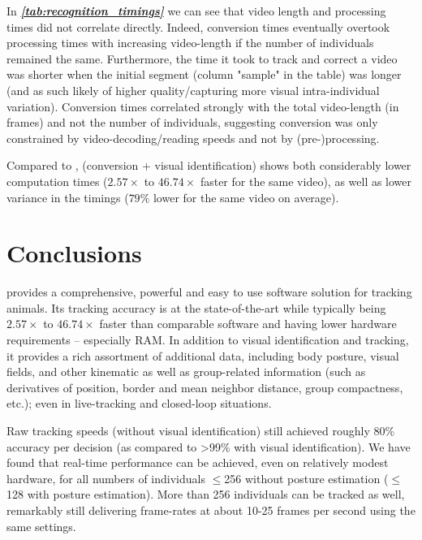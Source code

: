 \documentclass[9pt,lineno]{elife}
\newcommand{\tableref}[1]{\textit{\textbf{\ref{tab:#1}}}\xspace}
\newcommand{\idtracker}{\protect\path{ idtracker.ai}}
\newcommand{\TRex}{\protect\path{TRex}}
\begin{document}
In \tableref{recognition_timings} we can see that video length and processing times did not correlate directly. Indeed, conversion times eventually overtook processing times with increasing video-length if the number of individuals remained the same. Furthermore, the time it took to track and correct a video was shorter when the initial segment (column "sample" in the table) was longer (and as such likely of higher quality/capturing more visual intra-individual variation). Conversion times correlated strongly with the total video-length (in frames) and not the number of individuals, suggesting conversion was only constrained by video-decoding/reading speeds and not by (pre-)processing.

Compared to \idtracker{}, \TRex{} (conversion + visual identification) shows both considerably lower computation times ($2.57\times$ to $46.74\times$ faster for the same video), as well as lower variance in the timings ($79\%$ lower for the same video on average).


\section{Conclusions}

\TRex{} provides a comprehensive, powerful and easy to use software solution for tracking animals. Its tracking accuracy is at the state-of-the-art while typically being $2.57\times$ to $46.74\times$ faster than comparable software and having lower hardware requirements -- {\color{blue} especially} RAM. In addition to visual identification and tracking, it provides a rich assortment of additional data, including body posture, visual fields, and other kinematic as well as group-related information (such as derivatives of position, border and mean neighbor distance, group compactness, etc.); even in live-tracking and closed-loop situations. 

Raw tracking speeds (without visual identification) still achieved roughly 80\% accuracy per decision (as compared to >99\% with visual identification). We have found that real-time performance can be achieved, even on relatively modest hardware, for all numbers of individuals $\leq$256 without posture estimation ($\leq$ 128 with posture estimation). More than 256 individuals can be tracked as well, remarkably still delivering frame-rates at about 10-25 frames per second using the same settings.
\end{document}
